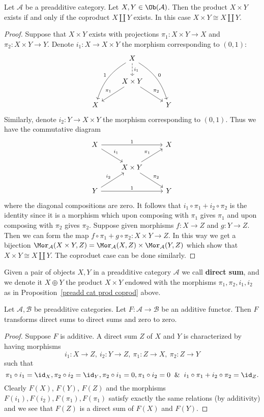 \begin{proposition}\label{preadd cat prod coprod}
Let $\mathcal{A}$ be a preadditive category. Let $X,Y\in\Ob(\mathcal{A})$. Then the product $X\times Y$ exists if and only if the coproduct $X\amalg Y$ exists. In this case $X\times Y\cong X\amalg Y$.
\end{proposition}
\begin{proof}
Suppose that $X\times Y$ exists with projections $\pi_1:X\times Y\to X$ and $\pi_2:X\times Y\to Y$. Denote $i_1:X\to X\times Y$ the morphism corresponding to $(0,1)$:
\[\begin{tikzcd}
&X\ar[ldd,bend right=20pt,swap,"1"]\ar[d,dashed,"i_1"]\ar[rdd,bend left=20pt,"0"]&\\
&X\times Y\ar[ld,swap,"\pi_1"]\ar[rd,"\pi_2"]&\\
X&&Y
\end{tikzcd}\]
Similarly, denote $i_2:Y\to X\times Y$ the morphism corresponding to $(0,1)$. Thus we have the commutative diagram
\[\begin{tikzcd}
X\ar[rr,"1"]\ar[rd,"i_1"]&&X\\
&X\times Y\ar[ru,"\pi_1"]\ar[rd,"\pi_2"]&\\
Y\ar[rr,"1"]\ar[ru,"i_2"]&&Y
\end{tikzcd}\]
where the diagonal compositions are zero. It follows that $i_1\circ \pi_1+i_2\circ\pi_2$ is the identity since it is a morphism which upon composing with $\pi_1$ gives $\pi_1$ and upon composing with $\pi_2$ gives $\pi_2$. Suppose given morphisms $f:X\to Z$ and $g:Y\to Z$. Then we can form the map $f\circ\pi_1+g\circ\pi_2:X\times Y\to Z$. In this way we get a bijection $\Mor_{\mathcal{A}}(X\times Y,Z)=\Mor_{\mathcal{A}}(X,Z)\times\Mor_{\mathcal{A}}(Y,Z)$ which show that $X\times Y\cong X\amalg Y$. The coproduet case can be done similarly.
\end{proof}

\begin{definition}
Given a pair of objects $X,Y$ in a preadditive category $\mathcal{A}$ we call \textbf{direct sum}, and we denote it $X\oplus Y$ the product $X\times Y$ endowed with the morphisms $\pi_1,\pi_2,i_1,i_2$ as in Proposition~\ref{preadd cat prod coprod} above.
\end{definition}
\begin{proposition}
Let $\mathcal{A},\mathcal{B}$ be preadditive categories. Let $F:\mathcal{A}\to\mathcal{B}$ be an additive functor. Then $F$ transforms direct sums to direct sums and zero to zero.
\end{proposition}
\begin{proof}
Suppose $F$ is additive. A direct sum $Z$ of $X$ and $Y$ is characterized by having morphisms 
\[i_1:X\to Z,\ i_2:Y\to Z,\ \pi_1:Z\to X,\ \pi_2:Z\to Y\]
such that
\[\pi_1\circ i_1=\id_X,\pi_2\circ i_2=\id_Y,\pi_2\circ i_1=0,\pi_1\circ i_2=0\And i_1\circ\pi_1+i_2\circ\pi_2=\id_Z.\]
Clearly $F(X)$, $F(Y)$, $F(Z)$ and the morphisms $F(i_1),F(i_2),F(\pi_1),F(\pi_1)$ satisfy exactly the same relations (by additivity) and we see that $F(Z)$ is a direct sum of $F(X)$ and $F(Y)$.
\end{proof}
